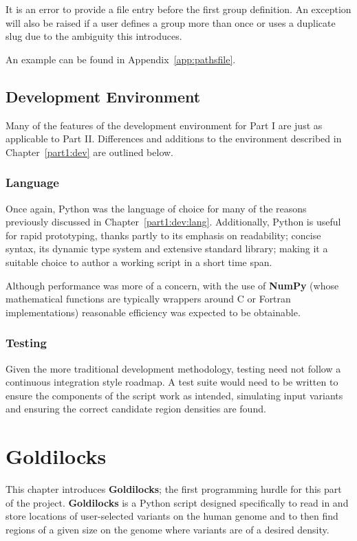 It is an error to provide a file entry before the first group definition. An
exception will also be raised if a user defines a group more than once or uses a
duplicate slug due to the ambiguity this introduces.

An example can be found in Appendix~\ref{app:pathsfile}.


\section{Development Environment}

Many of the features of the development environment for Part I are just as
applicable to Part II. Differences and additions to the environment described in
Chapter~\ref{part1:dev} are outlined below.

\subsection{Language}

Once again, Python was the language of choice for many of the reasons previously
discussed in Chapter~\ref{part1:dev:lang}. Additionally, Python is useful for
rapid prototyping, thanks partly to its emphasis on readability; concise
syntax, its dynamic type system and extensive standard library; making it a
suitable choice to author a working script in a short time span.

Although performance was more of a concern, with the use of \textbf{NumPy}
(whose mathematical functions are typically wrappers around C or Fortran
implementations) reasonable efficiency was expected to be obtainable.


\subsection{Testing}

Given the more traditional development methodology, testing need not follow a
continuous integration style roadmap. A test suite would need to be written to
ensure the components of the script work as intended, simulating input variants
and ensuring the correct candidate region densities are found.


\chapter{Goldilocks}

This chapter introduces \textbf{Goldilocks}; the first programming hurdle for
this part of the project. \textbf{Goldilocks} is a Python script designed
specifically to read in and store locations of user-selected variants on the
human genome and to then find regions of a given size on the genome where
variants are of a desired density.


